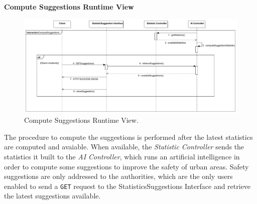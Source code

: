 \documentclass{report}
\begin{document}
\begin{center}\large{\textbf{Compute Suggestions Runtime View}}\end{center}
\begin{figure}[H]
	\begin{center}
	\includegraphics[width=.88\textwidth]{img/ComputeSuggestionss.pdf}
    \end{center}
    \label{fig:SuggestionsSD}
	\caption{Compute Suggestions Runtime View.}
\end{figure}
The procedure to compute the suggestions is performed after the latest statistics are computed and avaiable. When available, the \textit{Statistic Controller} sends the statistics it built to the \textit{AI Controller}, which runs an artificial intelligence in order to compute some suggestions to improve the safety of urban areas. Safety suggestions are only addressed to the authorities, which are the only users  enabled to send a \texttt{GET} request to the StatisticsSuggestions Interface and retrieve the latest suggestions available.
\end{document}
